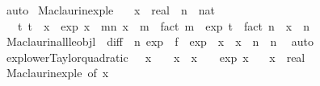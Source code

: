\begin{isabellebody}
\ auto%
\endisatagproof
{\isafoldproof}%
%
\isadelimproof
\isanewline
%
\endisadelimproof
\isanewline
{}\isamarkupfalse%
\ Maclaurin{\isacharunderscore}{\kern0pt}exp{\isacharunderscore}{\kern0pt}le{\isacharcolon}{\kern0pt}\isanewline
\ \ \ x\ {\isacharcolon}{\kern0pt}{\isacharcolon}{\kern0pt}\ real\ \ n\ {\isacharcolon}{\kern0pt}{\isacharcolon}{\kern0pt}\ nat\isanewline
\ \ \ {\isachardoublequoteopen}{\isasymexists}t{\isachardot}{\kern0pt}\ {\isasymbar}t{\isasymbar}\ {\isasymle}\ {\isasymbar}x{\isasymbar}\ {\isasymand}\ exp\ x\ {\isacharequal}{\kern0pt}\ {\isacharparenleft}{\kern0pt}{\isasymSum}m{\isacharless}{\kern0pt}n{\isachardot}{\kern0pt}\ {\isacharparenleft}{\kern0pt}x\ {\isacharcircum}{\kern0pt}\ m{\isacharparenright}{\kern0pt}\ {\isacharslash}{\kern0pt}\ fact\ m{\isacharparenright}{\kern0pt}\ {\isacharplus}{\kern0pt}\ {\isacharparenleft}{\kern0pt}exp\ t\ {\isacharslash}{\kern0pt}\ fact\ n{\isacharparenright}{\kern0pt}\ {\isacharasterisk}{\kern0pt}\ x\ {\isacharcircum}{\kern0pt}\ n{\isachardoublequoteclose}\isanewline
%
\isadelimproof
\ \ %
\endisadelimproof
%
\isatagproof
{}\isamarkupfalse%
\ Maclaurin{\isacharunderscore}{\kern0pt}all{\isacharunderscore}{\kern0pt}le{\isacharunderscore}{\kern0pt}objl\ {\isacharbrackleft}{\kern0pt}\ diff\ {\isacharequal}{\kern0pt}\ {\isachardoublequoteopen}{\isasymlambda}n{\isachardot}{\kern0pt}\ exp{\isachardoublequoteclose}\ \ f\ {\isacharequal}{\kern0pt}\ exp\ \ x\ {\isacharequal}{\kern0pt}\ x\ \ n\ {\isacharequal}{\kern0pt}\ n{\isacharbrackright}{\kern0pt}\ \isamarkupfalse%
\ auto%
\endisatagproof
{\isafoldproof}%
%
\isadelimproof
\isanewline
%
\endisadelimproof
\isanewline
{}\isamarkupfalse%
\ exp{\isacharunderscore}{\kern0pt}lower{\isacharunderscore}{\kern0pt}Taylor{\isacharunderscore}{\kern0pt}quadratic{\isacharcolon}{\kern0pt}\ {\isachardoublequoteopen}{}\ {\isasymle}\ x\ {\isasymLongrightarrow}\ {}\ {\isacharplus}{\kern0pt}\ x\ {\isacharplus}{\kern0pt}\ x\ {\isacharslash}{\kern0pt}\ {}\ {\isasymle}\ exp\ x{\isachardoublequoteclose}\isanewline
\ \ \ x\ {\isacharcolon}{\kern0pt}{\isacharcolon}{\kern0pt}\ real\isanewline
%
\isadelimproof
\ \ %
\endisadelimproof
%
\isatagproof
{}\isamarkupfalse%
\ Maclaurin{\isacharunderscore}{\kern0pt}exp{\isacharunderscore}{\kern0pt}le\ {\isacharbrackleft}{\kern0pt}of\ x\ {}{\isacharbrackright}{\kern0pt}\ \isamarkupfalse%

\end{isabellebody}
